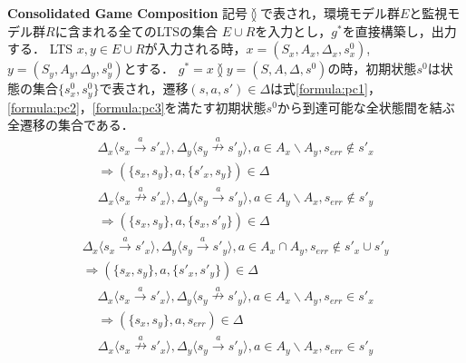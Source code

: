 \begin{dfn}{\textbf{Consolidated Game Composition}}
\label{def:consolidated_game_composition}
    記号$\between$で表され，環境モデル群$E$と監視モデル群$R$に含まれる全てのLTSの集合 $E \cup R$を入力とし，$g^*$を直接構築し，出力する．
    LTS $x,y \in E \cup R$が入力される時，$x = (S_{x}, A_{x}, \Delta_{x}, s^0_{x})$,
    $y = (S_{y}, A_{y}, \Delta_{y}, s^0_{y})$とする．
    $g^* = x \between y = (S, A, \Delta, s^0)$の時，初期状態$s^0$は状態の集合$\{ s^0_{x}, s^0_{y} \}$で表され，遷移$(s,a,s')\in\Delta$は式\ref{formula:pc1}，\ref{formula:pc2}，\ref{formula:pc3}を満たす初期状態$s^0$から到達可能な全状態間を結ぶ全遷移の集合である．
    \begin{multline}
    \label{formula:pc1}
    \Delta_x \langle s_{x} \overset{a}{\rightarrow} s'_{x} \rangle, \Delta_y \langle s_{y} \overset{a}{\nrightarrow} s'_{y} \rangle, a \in A_{x} \backslash A_{y}, s_{err} \notin s'_{x}\\
    \Rightarrow (\{ s_{x},s_{y} \},a,\{ s'_{x},s_{y} \} ) \in \Delta
    \end{multline}
    \begin{multline}
    \label{formula:pc2}
    \Delta_x \langle s_{x} \overset{a}{\nrightarrow} s'_{x} \rangle, \Delta_y \langle s_{y} \overset{a}{\rightarrow} s'_{y} \rangle, a \in A_{y} \backslash A_{x}, s_{err} \notin s'_{y}\\
    \Rightarrow (\{ s_{x},s_{y} \},a,\{ s_{x},s'_{y} \}) \in \Delta
    \end{multline}
    \begin{multline}
    \label{formula:pc3}
    \Delta_x \langle s_{x} \overset{a}{\rightarrow} s'_{x} \rangle, \Delta_y \langle s_{y} \overset{a}{\rightarrow} s'_{y} \rangle, a \in A_{x} \cap A_{y}, s_{err} \notin s'_{x} \cup s'_{y}\\
    \Rightarrow (\{ s_{x},s_{y} \},a,\{ s'_{x},s'_{y} \}) \in \Delta
    \end{multline}
    \begin{multline}
    \label{formula:pc4}
    \Delta_x \langle s_{x} \overset{a}{\rightarrow} s'_{x} \rangle, \Delta_y \langle s_{y} \overset{a}{\nrightarrow} s'_{y} \rangle, a \in A_{x} \backslash A_{y}, s_{err} \in s'_{x}\\
    \Rightarrow (\{ s_{x},s_{y} \},a,s_{err}) \in \Delta
    \end{multline}
    \begin{multline}
    \label{formula:pc5}
    \Delta_x \langle s_{x} \overset{a}{\nrightarrow} s'_{x} \rangle, \Delta_y \langle s_{y} \overset{a}{\rightarrow} s'_{y} \rangle, a \in A_{y} \backslash A_{x}, s_{err} \in s'_{y}\\

\end{multline}
\end{dfn}
